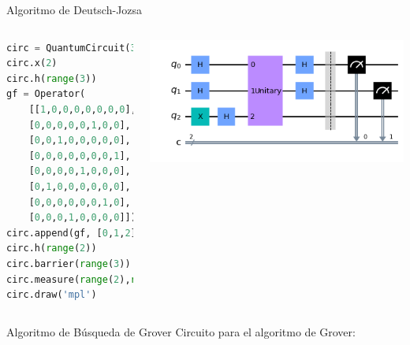 \documentclass[10pt,compress]{beamer}
\begin{document}
\begin{frame}[fragile]{Algoritmo de Deutsch-Jozsa}
\begin{columns}

\begin{lstlisting}[language=Python]
circ = QuantumCircuit(3,2)
circ.x(2)
circ.h(range(3))
gf = Operator(
    [[1,0,0,0,0,0,0,0],
    [0,0,0,0,0,1,0,0],
    [0,0,1,0,0,0,0,0],
    [0,0,0,0,0,0,0,1],
    [0,0,0,0,1,0,0,0],
    [0,1,0,0,0,0,0,0],
    [0,0,0,0,0,0,1,0],
    [0,0,0,1,0,0,0,0]])
circ.append(gf, [0,1,2])
circ.h(range(2))
circ.barrier(range(3))
circ.measure(range(2),range(2))
circ.draw('mpl')
\end{lstlisting}

\begin{center}
\includegraphics[width=\hsize]{qc_deutsch_jozsa}
\end{center}

\end{columns}

\end{frame}

\begin{frame}{Algoritmo de Búsqueda de Grover}
Circuito para el algoritmo de Grover:
\begin{center}
\end{center}
\end{frame}
\end{document}
